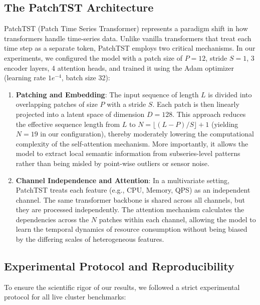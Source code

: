 \documentclass[conference]{IEEEtran}
\begin{document}
\subsection{The PatchTST Architecture}
PatchTST (Patch Time Series Transformer) represents a paradigm shift in how transformers handle time-series data. Unlike vanilla transformers that treat each time step as a separate token, PatchTST employs two critical mechanisms. In our experiments, we configured the model with a patch size of $P=12$, stride $S=1$, 3 encoder layers, 4 attention heads, and trained it using the Adam optimizer (learning rate $1e^{-4}$, batch size 32):

\begin{enumerate}
    \item \textbf{Patching and Embedding}: The input sequence of length $L$ is divided into overlapping patches of size $P$ with a stride $S$. Each patch is then linearly projected into a latent space of dimension $D=128$. This approach reduces the effective sequence length from $L$ to $N = \lfloor(L - P)/S\rfloor + 1$ (yielding $N=19$ in our configuration), thereby moderately lowering the computational complexity of the self-attention mechanism. More importantly, it allows the model to extract local semantic information from subseries-level patterns rather than being misled by point-wise outliers or sensor noise.
    \item \textbf{Channel Independence and Attention}: In a multivariate setting, PatchTST treats each feature (e.g., CPU, Memory, QPS) as an independent channel. The same transformer backbone is shared across all channels, but they are processed independently. The attention mechanism calculates the dependencies across the $N$ patches within each channel, allowing the model to learn the temporal dynamics of resource consumption without being biased by the differing scales of heterogeneous features.
\end{enumerate}

\subsection{Experimental Protocol and Reproducibility}
To ensure the scientific rigor of our results, we followed a strict experimental protocol for all live cluster benchmarks:
\end{document}
